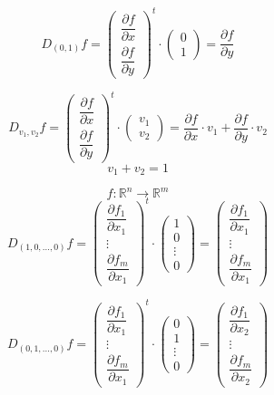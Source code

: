 \documentclass[11pt]{article}
\begin{document}
\[
D_{(0,1)} f = \begin{pmatrix}
    \dfrac{\partial f}{\partial x} \\
    \dfrac{\partial f}{\partial y}
\end{pmatrix}^t \cdot \begin{pmatrix}
    0 \\
    1
\end{pmatrix} = \dfrac{\partial f}{\partial y}
\]

\[
D_{v_1, v_2} f = \begin{pmatrix}
    \dfrac{\partial f}{\partial x} \\
    \dfrac{\partial f}{\partial y}
\end{pmatrix}^t \cdot \begin{pmatrix}
    v_1 \\
    v_2
\end{pmatrix} = \dfrac{\partial f}{\partial x} \cdot v_1 + \dfrac{\partial f}{\partial y} \cdot v_2
\]
\[ v_1 + v_2 = 1 \]

\[
f : \mathbb{R}^n \rightarrow \mathbb{R}^m
\]
\[
D_{(1,0, \ldots, 0)} f = \begin{pmatrix}
    \dfrac{\partial f_1}{\partial x_1} \\
    \vdots \\
    \dfrac{\partial f_m}{\partial x_1}
\end{pmatrix}^t \cdot \begin{pmatrix}
    1 \\
    0 \\
    \vdots \\
    0
\end{pmatrix} = \begin{pmatrix}
    \dfrac{\partial f_1}{\partial x_1} \\
    \vdots \\
    \dfrac{\partial f_m}{\partial x_1}
\end{pmatrix}
\]

\[
D_{(0,1, \ldots, 0)} f = \begin{pmatrix}
    \dfrac{\partial f_1}{\partial x_1} \\
    \vdots \\
    \dfrac{\partial f_m}{\partial x_1}
\end{pmatrix}^t \cdot \begin{pmatrix}
    0 \\
    1 \\
    \vdots \\
    0
\end{pmatrix} = \begin{pmatrix}
    \dfrac{\partial f_1}{\partial x_2} \\
    \vdots \\
    \dfrac{\partial f_m}{\partial x_2}
\end{pmatrix}
\]
\end{document}
